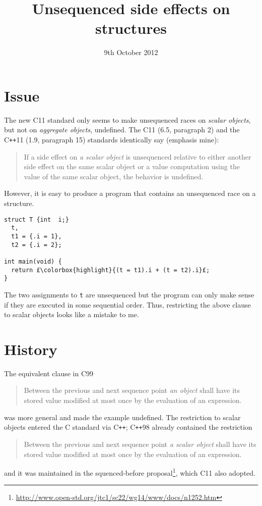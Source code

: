 \documentclass[a4paper,11pt]{article}
\title{Unsequenced side effects on structures}
\date{9th October 2012}
\begin{document}
\maketitle

\section{Issue}

The new C11 standard only seems to make unsequenced races on {\em
  scalar objects}, but not on {\em aggregate objects}, undefined. The
C11 (6.5, paragraph 2) and the C\lstinline{++}11 (1.9, paragraph 15)
standards identically say (emphasis mine):
\begin{quote}
  If a side effect on {\em a scalar object} is unsequenced relative to either
  another side effect on the same scalar object or a value computation using
  the value of the same scalar object, the behavior is undefined.
\end{quote}
However, it is easy to produce a program that contains an unsequenced race on a structure.
\begin{lstlisting}
struct T {int  i;}
  t,
  t1 = {.i = 1},
  t2 = {.i = 2};

int main(void) {
  return £\colorbox{highlight}{(t = t1).i + (t = t2).i}£;
}
\end{lstlisting}
The two assignments to \lstinline{t} are unsequenced but the program
can only make sense if they are executed in some sequential
order. Thus, restricting the above clause to scalar objects looks like
a mistake to me.

\section{History}
The equivalent clause in C99
\begin{quote}
  Between the previous and next sequence point {\em an object} shall have its
  stored value modified at most once by the evaluation of an expression.
\end{quote}
was more general and made the example undefined. The restriction to
scalar objects entered the C standard via C\lstinline{++};
C\lstinline{++}98 already contained the restriction
\begin{quote}
  Between the previous and next sequence point {\em a scalar object} shall
  have its stored value modified at most once by the evaluation of an
  expression.
\end{quote}
and it was maintained in the squenced-before
proposal\footnote{\url{http://www.open-std.org/jtc1/sc22/wg14/www/docs/n1252.htm}},
which C11 also adopted.
\end{document}
